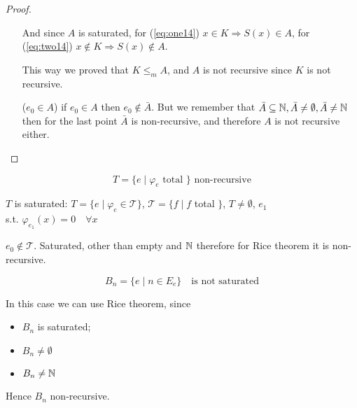 \begin{proof}
\begin{itemize}
    And since $A$ is saturated, for (\ref{eq:one14})
    $x \in K \Rightarrow S(x) \in A$, for (\ref{eq:two14})
    $x\notin K \Rightarrow S(x) \notin A$.

    This way we proved that $K \leq_m A$, and $A$ is not recursive
    since $K$ is not recursive.

  \item[($e_0 \in A$)] if $ e_0 \in A $ then $ e_0 \not \in \bar{A}
    $. But we remember that
    $ \bar{A} \subseteq \mathbb{N}, \bar{A} \neq \emptyset, \bar{A} \neq
    \mathbb{N} $ then for the last point $ \bar{A} $ is non-recursive, and
    therefore $A$ is not recursive either.
  \end{itemize}
\end{proof}

\begin{example}
  \[ T = \{e \mid \varphi_e \mbox{ total } \} \mbox{ non-recursive} \]

  $T$ is saturated: $ T = \{e \mid \varphi_e \in \mathcal{T} \} $, $
  \mathcal{T} = \{f \mid f $ total $ \} $, $ T\neq\emptyset $, $ e_1 $\\
  s.t. $ \varphi_{e_1}(x) = 0 \quad \forall x $

  $ e_0 \notin \mathcal{T} $. Saturated, other than empty and $ \mathbb{N} $
  therefore for Rice theorem it is non-recursive.
\end{example}

\begin{example}
  \[ B_n = \{e \mid n \in E_e \} \quad \mbox{is not saturated} \]

  In this case we can use Rice theorem, since
  \begin{itemize}
  \item $B_n$ is saturated;
  \item $B_n \neq \emptyset$
  \item $B_n \neq \mathbb{N}$
  \end{itemize}

  Hence $ B_n $ non-recursive.
\end{example}
